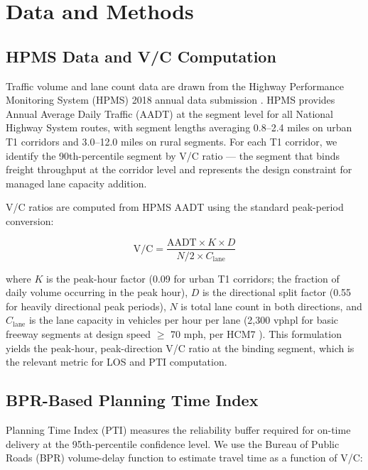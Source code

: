 \section{Data and Methods}
\label{sec:data}

\subsection{HPMS Data and V/C Computation}

Traffic volume and lane count data are drawn from the Highway Performance Monitoring System (HPMS) 2018 annual data submission \citep{FHWA_HPMS2023}. HPMS provides Annual Average Daily Traffic (AADT) at the segment level for all National Highway System routes, with segment lengths averaging 0.8--2.4 miles on urban T1 corridors and 3.0--12.0 miles on rural segments. For each T1 corridor, we identify the 90th-percentile segment by V/C ratio --- the segment that binds freight throughput at the corridor level and represents the design constraint for managed lane capacity addition.

V/C ratios are computed from HPMS AADT using the standard peak-period conversion:

\begin{equation}
\text{V/C} = \frac{\text{AADT} \times K \times D}{N/2 \times C_{\text{lane}}}
\label{eq:vc}
\end{equation}

where $K$ is the peak-hour factor (0.09 for urban T1 corridors; the fraction of daily volume occurring in the peak hour), $D$ is the directional split factor (0.55 for heavily directional peak periods), $N$ is total lane count in both directions, and $C_{\text{lane}}$ is the lane capacity in vehicles per hour per lane (2,300 vphpl for basic freeway segments at design speed $\geq$ 70 mph, per HCM7 \citep{HCM7}). This formulation yields the peak-hour, peak-direction V/C ratio at the binding segment, which is the relevant metric for LOS and PTI computation.

\subsection{BPR-Based Planning Time Index}

Planning Time Index (PTI) measures the reliability buffer required for on-time delivery at the 95th-percentile confidence level. We use the Bureau of Public Roads (BPR) volume-delay function to estimate travel time as a function of V/C:

